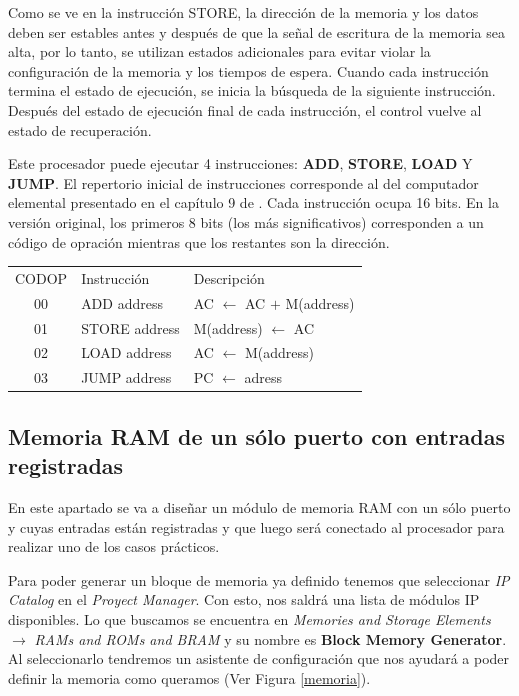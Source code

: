 Como se ve en la instrucción STORE, la dirección de la memoria y los datos deben ser estables antes y después de que la señal de escritura de la memoria 
sea alta, por lo tanto, se utilizan estados adicionales para evitar violar la configuración de la memoria y los tiempos de espera. Cuando cada 
instrucción termina el estado de ejecución, se inicia la búsqueda de la siguiente instrucción.  Después del estado de ejecución final de cada instrucción, el control 
vuelve al estado de recuperación.

Este procesador puede ejecutar 4 instrucciones: \textbf{ADD}, \textbf{STORE}, \textbf{LOAD} Y \textbf{JUMP}. El repertorio 
inicial de instrucciones corresponde al del computador elemental presentado en el capítulo 9 de \cite{hamblen2007rapid}. Cada 
instrucción ocupa 16 bits. En la versión original, los primeros 8 bits (los más significativos) corresponden a un código de 
opración mientras que los restantes son la dirección.

\begin{tabular}{c l l}
    CODOP & Instrucción & Descripción \\
    00 & ADD address & AC $\leftarrow$ AC $+$ M(address) \\
    01 & STORE address & M(address) $\leftarrow$ AC \\
    02 & LOAD address &  AC $\leftarrow$ M(address) \\
    03 & JUMP address &  PC $\leftarrow$ adress\\
\end{tabular}

\subsection{Memoria RAM de un sólo puerto con entradas registradas}

En este apartado se va a diseñar un módulo de memoria RAM con un sólo puerto y cuyas entradas están registradas y que luego 
será conectado al procesador para realizar uno de los casos prácticos.

Para poder generar un bloque de memoria ya definido tenemos que seleccionar \textit{IP Catalog} en el \textit{Proyect 
Manager}. Con esto, nos saldrá una lista de módulos IP disponibles. Lo que buscamos se encuentra en 
\textit{Memories and Storage Elements} $\rightarrow$ \textit{RAMs and ROMs and BRAM} y su nombre es 
\textbf{Block Memory Generator}. Al seleccionarlo tendremos un asistente de configuración que nos ayudará 
a poder definir la memoria como queramos (Ver Figura \ref{memoria}).

